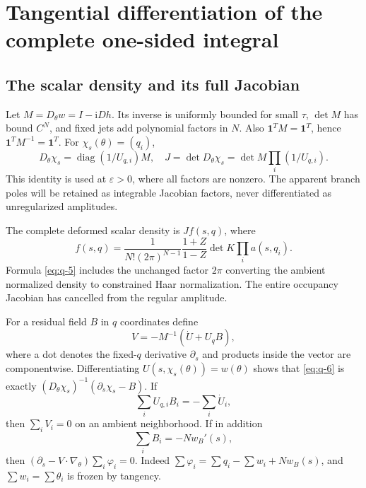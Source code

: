 \documentclass[11pt]{article}
\numberwithin{equation}{section}
\theoremstyle{remark}\newtheorem{remark}[theorem]{Remark}
\newcommand{\ii}{\mathrm i}
\begin{document}
\section{Tangential differentiation of the complete one-sided integral}\label{sec:constrained-transport}\label{sec:global-transport}\subsection{The scalar density and its full Jacobian}

Let $M=D_\theta w=I-\ii Dh$. Its inverse is uniformly bounded for
small $\tau$, $\det M$ has bound $C^N$, and fixed jets add polynomial
factors in $N$. Also $\boldsymbol1^TM=\boldsymbol1^T$, hence
$\boldsymbol1^TM^{-1}=\boldsymbol1^T$. For
$\chi_s(\theta)=(q_i)$,
\begin{equation}\label{eq:q-4}
D_\theta\chi_s=\operatorname{diag}(1/U_{q,i})M,
 \quad J=\det D_\theta\chi_s
       =\det M\prod_i(1/U_{q,i}).
\end{equation}
This identity is used at $\varepsilon>0$, where all factors are
nonzero. The apparent branch poles will be retained as integrable
Jacobian factors, never differentiated as unregularized amplitudes.

The complete deformed scalar density is $J f(s,q)$, where
\begin{equation}\label{eq:q-5}
f(s,q)=\frac1{N!(2\pi)^{N-1}}
 \frac{1+Z}{1-Z}\det K\prod_i a(s,q_i).
\end{equation}
Formula \eqref{eq:q-5} includes the unchanged factor $2\pi$ converting the
ambient normalized density to constrained Haar normalization. The
entire occupancy Jacobian has cancelled from the regular amplitude.

For a residual field $B$ in $q$ coordinates define
\begin{equation}\label{eq:q-6}
V=-M^{-1}(\dot U+U_q B),
\end{equation}
where a dot denotes the fixed-$q$ derivative $\partial_s$ and products
inside the vector are componentwise. Differentiating
$U(s,\chi_s(\theta))=w(\theta)$ shows that \eqref{eq:q-6} is exactly
$(D_\theta\chi_s)^{-1}(\partial_s\chi_s-B)$.
If
\begin{equation}\label{eq:q-7}
\sum_i U_{q,i}B_i=-\sum_i\dot U_i,
\end{equation}
then $\sum_iV_i=0$ on an ambient neighborhood. If in addition
\begin{equation}\label{eq:q-8}
\sum_iB_i=-Nw_B'(s),
\end{equation}
then $(\partial_s-V\cdot\nabla_\theta)\sum_i\varphi_i=0$.
Indeed $\sum\varphi_i=\sum q_i-\sum w_i+Nw_B(s)$, and
$\sum w_i=\sum\theta_i$ is frozen by tangency.
\end{document}
